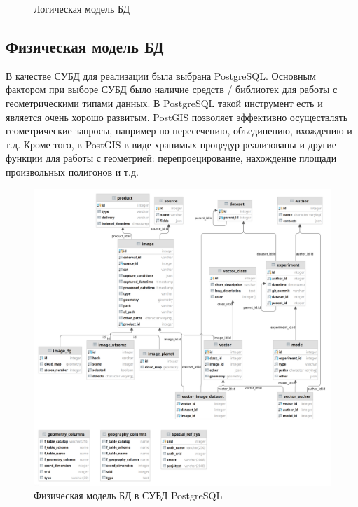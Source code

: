 \documentclass[a4paper]{article}
\begin{document}
\begin{figure}[h]
	\centering
	
	\caption{Логическая модель БД}
\end{figure}


\subsection{Физическая модель БД}
В качестве СУБД для реализации была выбрана PostgreSQL.
Основным фактором при выборе СУБД было наличие средств / библиотек для работы с геометрическими типами данных.
В PostgreSQL такой инструмент есть и является очень хорошо развитым.
PostGIS позволяет эффективно осуществлять геометрические запросы, например по пересечению, объединению, вхождению и т.д.
Кроме того, в PostGIS в виде хранимых процедур реализованы и другие функции для работы с геометрией: перепроецирование, нахождение площади произвольных полигонов и т.д.

\begin{figure}[h]
	\centering
	\includegraphics[width=\columnwidth]{./images/Physics.png}
	\caption{Физическая модель БД в СУБД PostgreSQL}
\end{figure}


	
\end{document}
